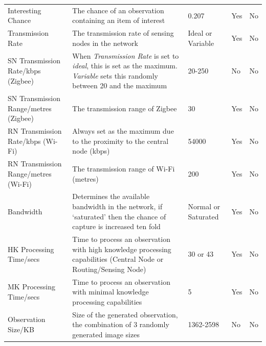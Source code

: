 \begin{landscape}
\begin{table}
\begin{tabularx}{\textwidth}{|p{4cm}|p{10cm}|p{3cm}|p{2cm}|p{2cm}|}
	Interesting Chance                      & The chance of an observation containing an item of interest                                                                 & 0.207               & Yes                & No                 \\
	Transmission Rate                       & The transmission rate of sensing nodes in the network                                                                      & Ideal or Variable   & Yes                & No                 \\
	SN Transmission Rate/kbps (Zigbee) & When \textit{Transmission Rate} is set to \textit{ideal}, this is set as the maximum. \textit{Variable} sets this randomly between 20 and the maximum & 20-250          & No                 & No                 \\
	SN Transmission Range/metres (Zigbee)& The transmission range of Zigbee                                                                                  & 30                  & Yes                & No                 \\
	RN Transmission Rate/kbps (Wi-Fi)  & Always set as the maximum due to the proximity to the central node (kbps)                                                         & 54000           & Yes                & No                 \\
	RN Transmission Range/metres (Wi-Fi) & The transmission range of Wi-Fi (metres)                                                                                            & 200                 & Yes                & No                 \\
	Bandwidth                               & Determines the available bandwidth in the network, if `saturated' then the chance of capture is increased ten fold          & Normal or Saturated & Yes                & No                 \\
	HK Processing Time/secs                     & Time to process an observation with high knowledge processing capabilities (Central Node or Routing/Sensing Node)           & 30 or 43            & Yes                & No                 \\
	MK Processing Time/secs                      & Time to process an observation with minimal knowledge processing capabilities                                               & 5                   & Yes                & No                 \\
	Observation Size/KB                       & Size of the generated observation, the combination of 3 randomly generated image sizes                                      & 1362-2598        & No                 & No                 \\

\end{tabularx}
\end{table}
\end{landscape}
